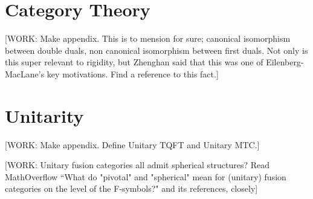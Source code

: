 \documentclass{article}
\theoremstyle{definition}
\numberwithin{figure}{section}
\begin{document}
\section{Category Theory}
\label{Categories}
[WORK: Make appendix. This is to mension for sure; canonical isomorphism between double duals, non canonical isomorphism between first duals. Not only is this super relevant to rigidity, but Zhenghan said that this was one of Eilenberg-MacLane's key motivations. Find a reference to this fact.]

\section{Unitarity}
\label{Unitarity}
[WORK: Make appendix. Define Unitary TQFT and Unitary MTC.]

[WORK: Unitary fusion categories all admit spherical structures? Read MathOverflow ``What do "pivotal" and "spherical" mean for (unitary) fusion categories on the level of the 
F-symbols?"  and its references, closely]





\end{document}
